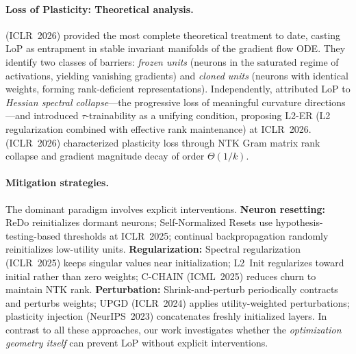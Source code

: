 \documentclass{article}
\theoremstyle{plain}
\theoremstyle{definition}
\theoremstyle{remark}
\begin{document}
\paragraph{Loss of Plasticity: Theoretical analysis.}
\citet{joudaki2026barriers} (ICLR~2026) provided the most complete theoretical treatment to date, casting LoP as entrapment in stable invariant manifolds of the gradient flow ODE. They identify two classes of barriers: \emph{frozen units} (neurons in the saturated regime of activations, yielding vanishing gradients) and \emph{cloned units} (neurons with identical weights, forming rank-deficient representations). Independently, \citet{he2025spectral} attributed LoP to \emph{Hessian spectral collapse}---the progressive loss of meaningful curvature directions---and introduced $\tau$-trainability as a unifying condition, proposing L2-ER (L2 regularization combined with effective rank maintenance) at ICLR~2026. \citet{wu2026rank} (ICLR~2026) characterized plasticity loss through NTK Gram matrix rank collapse and gradient magnitude decay of order $\Theta(1/k)$.

\paragraph{Mitigation strategies.}
The dominant paradigm involves explicit interventions. \textbf{Neuron resetting:} ReDo \citep{sokar2023dormant} reinitializes dormant neurons; Self-Normalized Resets \citep{farias2025snr} use hypothesis-testing-based thresholds at ICLR~2025; continual backpropagation \citep{dohare2024loss} randomly reinitializes low-utility units. \textbf{Regularization:} Spectral regularization \citep{lewandowski2025spectral} (ICLR~2025) keeps singular values near initialization; L2~Init \citep{kumar2025l2init} regularizes toward initial rather than zero weights; C-CHAIN \citep{tang2025mitigating} (ICML~2025) reduces churn to maintain NTK rank. \textbf{Perturbation:} Shrink-and-perturb \citep{ash2020warm} periodically contracts and perturbs weights; UPGD \citep{elsayed2024upgd} (ICLR~2024) applies utility-weighted perturbations; plasticity injection \citep{nikishin2023plasticity} (NeurIPS~2023) concatenates freshly initialized layers. In contrast to all these approaches, our work investigates whether the \emph{optimization geometry itself} can prevent LoP without explicit interventions.
\end{document}
